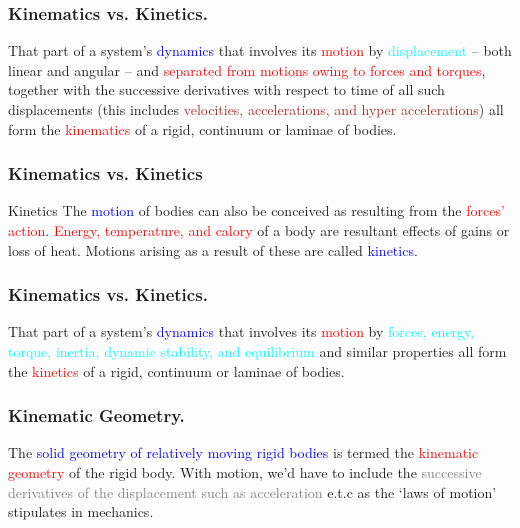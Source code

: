 \begin{frame}
	\frametitle{Kinematics vs. Kinetics.}
	\begin{definition}[Truesdell]
		That part of a system's \textcolor{blue}{dynamics} that involves its \textcolor{red}{motion} by \textcolor{cyan}{displacement} -- both linear and angular -- and \textcolor{red}{separated from motions owing to forces and  torques}, together with the successive derivatives with respect to time of all such displacements (this includes \textcolor{brown}{velocities, accelerations, and hyper accelerations}) all form the \textcolor{red}{kinematics} of a \textcolor{light-blue}{{rigid}}, \textcolor{light-blue}{{continuum}} or \textcolor{light-blue}{{laminae}} of bodies.
	\end{definition}
\end{frame}


\begin{frame}
	\frametitle{Kinematics vs. Kinetics}
	\begin{block}{Kinetics}
		The \textcolor{blue}{motion} of bodies can also be conceived as resulting from the  \textcolor{red}{forces' action}.  \textcolor{red}{Energy, temperature, and calory} of a body are resultant effects of gains or loss of heat. Motions arising as a result of these are called \textcolor{blue}{kinetics}.
	\end{block}
\end{frame}


\begin{frame}
	\frametitle{Kinematics vs. Kinetics.}
	\begin{definition}
		That part of a system's \textcolor{blue}{dynamics} that involves its \textcolor{red}{motion} by \textcolor{cyan}{forces, energy, torque, inertia, dynamic stability, and equilibrium} and similar properties all form the \textcolor{red}{kinetics} of a \textcolor{light-blue}{{rigid}}, \textcolor{light-blue}{{continuum}} or \textcolor{light-blue}{{laminae}} of bodies.
	\end{definition}
\end{frame}

\begin{frame}
	\frametitle{Kinematic Geometry.}
	\begin{definition}
		The \textcolor{blue}{solid geometry of relatively moving rigid bodies} is termed the \textcolor{red}{kinematic geometry} of the rigid body. With \textcolor{light-blue}{motion}, we'd have to include the \textcolor{gray}{successive derivatives of the displacement such as acceleration} e.t.c as the `laws of motion' stipulates in mechanics.
	\end{definition}
\end{frame}



